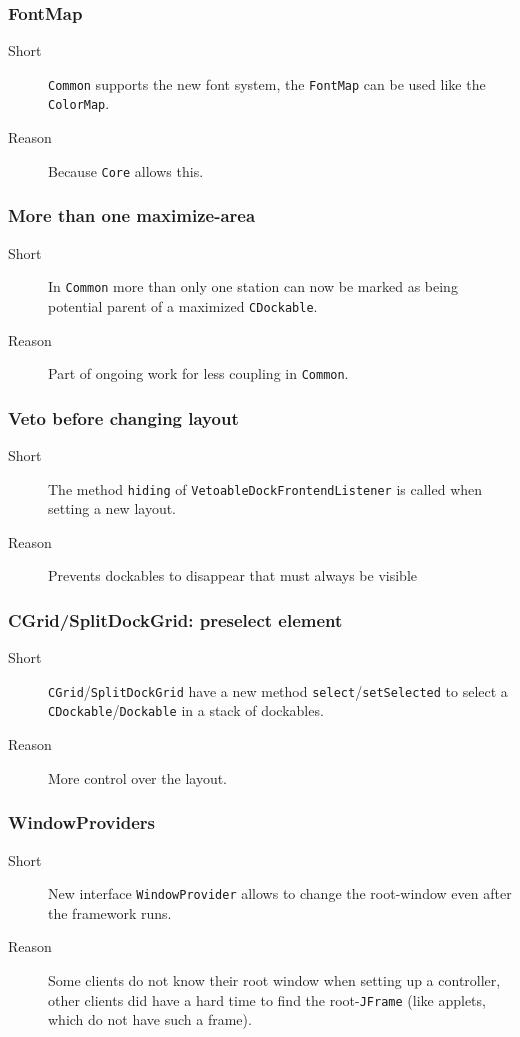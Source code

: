 \documentclass[a4paper,10pt]{article}
\newcommand{\src}[1]{\lstinline[basicstyle=\normalsize\ttfamily,keywordstyle=\normalsize\ttfamily,identifierstyle=\normalsize\ttfamily]|#1|}
\newcommand{\short}{\item[Short]}
\newcommand{\why}{\item[Reason]}
\begin{document}
\subsubsection{FontMap}
\begin{description}
 \short \src{Common} supports the new font system, the \src{FontMap} can be used like the \src{ColorMap}.
 \why Because \src{Core} allows this.
\end{description}

\subsubsection{More than one maximize-area}
\begin{description}
 \short In \src{Common} more than only one station can now be marked as being potential parent of a maximized \src{CDockable}.
 \why Part of ongoing work for less coupling in \src{Common}.
\end{description}

\subsubsection{Veto before changing layout}
\begin{description}
 \short The method \src{hiding} of \src{VetoableDockFrontendListener} is called when setting a new layout.
 \why Prevents dockables to disappear that must always be visible
\end{description}

\subsubsection{CGrid/SplitDockGrid: preselect element}
\begin{description}
 \short \src{CGrid}/\src{SplitDockGrid} have a new method \src{select}/\src{setSelected} to select a \src{CDockable}/\src{Dockable} in a stack of dockables.
 \why More control over the layout.
\end{description}

\subsubsection{WindowProviders}
\begin{description}
 \short New interface \src{WindowProvider} allows to change the root-window even after the framework runs.
 \why Some clients do not know their root window when setting up a controller, other clients did have a hard time to find the root-\src{JFrame} (like applets, which do not have such a frame).
\end{description}
\end{document}

